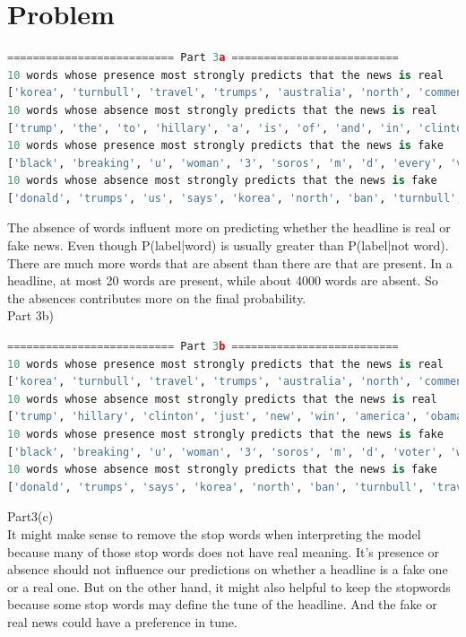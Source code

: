 \documentclass{article}
\newcommand{\enterProblemHeader}[1]{
}
\newcommand{\exitProblemHeader}[1]{
}
\newcounter{homeworkProblemCounter} %
\newcommand{\homeworkProblemName}{}
\newenvironment{homeworkProblem}[1][Problem \arabic{homeworkProblemCounter}]{ %
\stepcounter{homeworkProblemCounter} %
\renewcommand{\homeworkProblemName}{#1} %
\section{\homeworkProblemName} %
\enterProblemHeader{\homeworkProblemName} %
}{
\exitProblemHeader{\homeworkProblemName} %
}
\begin{document}
\begin{homeworkProblem}
\begin{framed}
\begin{lstlisting}[language=python]
========================== Part 3a ==========================
10 words whose presence most strongly predicts that the news is real
['korea', 'turnbull', 'travel', 'trumps', 'australia', 'north', 'comments', 'ban', 'refugee', 'paris']
10 words whose absence most strongly predicts that the news is real
['trump', 'the', 'to', 'hillary', 'a', 'is', 'of', 'and', 'in', 'clinton']
10 words whose presence most strongly predicts that the news is fake
['black', 'breaking', 'u', 'woman', '3', 'soros', 'm', 'd', 'every', 'voter']
10 words whose absence most strongly predicts that the news is fake
['donald', 'trumps', 'us', 'says', 'korea', 'north', 'ban', 'turnbull', 'travel', 'wall']
\end{lstlisting}
\end{framed}
The absence of words influent more on predicting whether the headline is real or fake news. Even though P(label|word) is usually greater than P(label|not word). There are much more words that are absent than there are that are present. In a headline, at most 20 words are present, while about 4000 words are absent. So the absences contributes more on the final probability.\\
\clearpage
Part 3b)
\begin{framed}
\begin{lstlisting}[language=python]
========================== Part 3b ==========================
10 words whose presence most strongly predicts that the news is real
['korea', 'turnbull', 'travel', 'trumps', 'australia', 'north', 'comments', 'ban', 'refugee', 'paris']
10 words whose absence most strongly predicts that the news is real
['trump', 'hillary', 'clinton', 'just', 'new', 'win', 'america', 'obama', 'black', 'victory']
10 words whose presence most strongly predicts that the news is fake
['black', 'breaking', 'u', 'woman', '3', 'soros', 'm', 'd', 'voter', 'watch']
10 words whose absence most strongly predicts that the news is fake
['donald', 'trumps', 'says', 'korea', 'north', 'ban', 'turnbull', 'travel', 'wall', 'australia']
\end{lstlisting}
\end{framed}
Part3(c)\\
It might make sense to remove the stop words when interpreting the model because many of those stop words does not have real meaning. It's presence or absence should not influence our predictions on whether a headline is a fake one or a real one. But on the other hand, it might also helpful to keep the stopwords because some stop words may define the tune of the headline. And the fake or real news could have a preference in tune.
\end{homeworkProblem}
\clearpage
\end{document}
